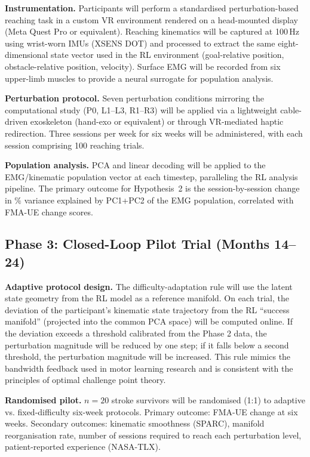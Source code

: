\documentclass[12pt]{article}
\begin{document}
\textbf{Instrumentation.}
Participants will perform a standardised perturbation-based reaching task
in a custom VR environment rendered on a head-mounted display (Meta Quest
Pro or equivalent).
Reaching kinematics will be captured at 100\,Hz using wrist-worn IMUs
(XSENS DOT) and processed to extract the same eight-dimensional state
vector used in the RL environment (goal-relative position, obstacle-relative
position, velocity).
Surface EMG will be recorded from six upper-limb muscles to provide a
neural surrogate for population analysis.

\textbf{Perturbation protocol.}
Seven perturbation conditions mirroring the computational study (P0, L1--L3,
R1--R3) will be applied via a lightweight cable-driven exoskeleton
(hand-exo or equivalent) or through VR-mediated haptic redirection.
Three sessions per week for six weeks will be administered, with each
session comprising 100 reaching trials.

\textbf{Population analysis.}
PCA and linear decoding will be applied to the EMG/kinematic population
vector at each timestep, paralleling the RL analysis pipeline.
The primary outcome for Hypothesis~2 is the session-by-session change in
$\%$ variance explained by PC1+PC2 of the EMG population, correlated
with FMA-UE change scores.

\subsection{Phase 3: Closed-Loop Pilot Trial (Months 14--24)}

\textbf{Adaptive protocol design.}
The difficulty-adaptation rule will use the latent state geometry from the
RL model as a reference manifold.
On each trial, the deviation of the participant's kinematic state trajectory
from the RL ``success manifold'' (projected into the common PCA space) will
be computed online.
If the deviation exceeds a threshold calibrated from the Phase 2 data, the
perturbation magnitude will be reduced by one step; if it falls below a
second threshold, the perturbation magnitude will be increased.
This rule mimics the bandwidth feedback used in motor learning research and
is consistent with the principles of optimal challenge point theory.

\textbf{Randomised pilot.}
$n=20$ stroke survivors will be randomised (1:1) to adaptive vs.
fixed-difficulty six-week protocols.
Primary outcome: FMA-UE change at six weeks.
Secondary outcomes: kinematic smoothness (SPARC), manifold reorganisation
rate, number of sessions required to reach each perturbation level,
patient-reported experience (NASA-TLX).
\end{document}

